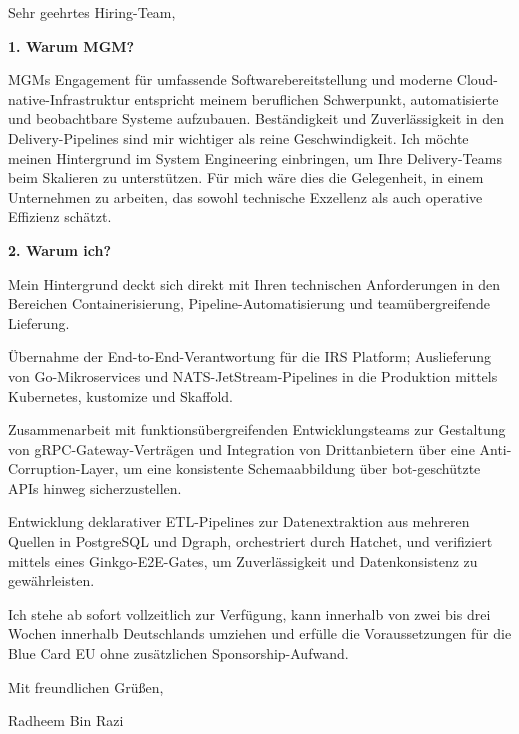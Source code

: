 \documentclass[11pt,a4paper]{coverletter}
\begin{document}
\opening{Sehr geehrtes Hiring-Team,}

\vspace{8pt}\noindent\textbf{1. Warum MGM?}\par\vspace{3pt}

MGMs Engagement für umfassende Softwarebereitstellung und moderne Cloud-native-Infrastruktur entspricht meinem beruflichen Schwerpunkt, automatisierte und beobachtbare Systeme aufzubauen. Beständigkeit und Zuverlässigkeit in den Delivery-Pipelines sind mir wichtiger als reine Geschwindigkeit. Ich möchte meinen Hintergrund im System Engineering einbringen, um Ihre Delivery-Teams beim Skalieren zu unterstützen. Für mich wäre dies die Gelegenheit, in einem Unternehmen zu arbeiten, das sowohl technische Exzellenz als auch operative Effizienz schätzt.

\vspace{8pt}\noindent\textbf{2. Warum ich?}\par\vspace{3pt}

Mein Hintergrund deckt sich direkt mit Ihren technischen Anforderungen in den Bereichen Containerisierung, Pipeline-Automatisierung und teamübergreifende Lieferung.

\bullets

  \item Übernahme der End-to-End-Verantwortung für die IRS Platform; Auslieferung von Go-Mikroservices und NATS-JetStream-Pipelines in die Produktion mittels Kubernetes, kustomize und Skaffold.

  \item Zusammenarbeit mit funktionsübergreifenden Entwicklungsteams zur Gestaltung von gRPC-Gateway-Verträgen und Integration von Drittanbietern über eine Anti-Corruption-Layer, um eine konsistente Schemaabbildung über bot-geschützte APIs hinweg sicherzustellen.

  \item Entwicklung deklarativer ETL-Pipelines zur Datenextraktion aus mehreren Quellen in PostgreSQL und Dgraph, orchestriert durch Hatchet, und verifiziert mittels eines Ginkgo-E2E-Gates, um Zuverlässigkeit und Datenkonsistenz zu gewährleisten.

\bulletsend

Ich stehe ab sofort vollzeitlich zur Verfügung, kann innerhalb von zwei bis drei Wochen innerhalb Deutschlands umziehen und erfülle die Voraussetzungen für die Blue Card EU ohne zusätzlichen Sponsorship-Aufwand.

\closing{Mit freundlichen Grüßen,}{Radheem Bin Razi}
\end{document}
